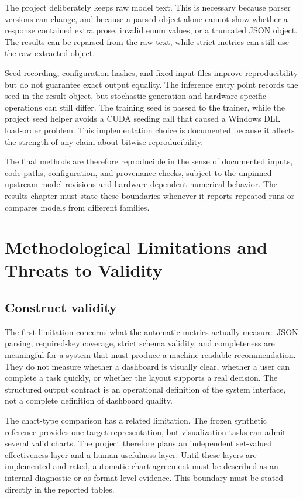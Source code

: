 The project deliberately keeps raw model text. This is necessary because parser versions can change, and because a parsed object alone cannot show whether a response contained extra prose, invalid enum values, or a truncated JSON object. The results can be reparsed from the raw text, while strict metrics can still use the raw extracted object.

Seed recording, configuration hashes, and fixed input files improve reproducibility but do not guarantee exact output equality. The inference entry point records the seed in the result object, but stochastic generation and hardware-specific operations can still differ. The training seed is passed to the trainer, while the project seed helper avoids a CUDA seeding call that caused a Windows DLL load-order problem. This implementation choice is documented because it affects the strength of any claim about bitwise reproducibility.

The final methods are therefore reproducible in the sense of documented inputs, code paths, configuration, and provenance checks, subject to the unpinned upstream model revisions and hardware-dependent numerical behavior. The results chapter must state these boundaries whenever it reports repeated runs or compares models from different families.

\section{Methodological Limitations and Threats to Validity}

\subsection{Construct validity}

The first limitation concerns what the automatic metrics actually measure. JSON parsing, required-key coverage, strict schema validity, and completeness are meaningful for a system that must produce a machine-readable recommendation. They do not measure whether a dashboard is visually clear, whether a user can complete a task quickly, or whether the layout supports a real decision. The structured output contract is an operational definition of the system interface, not a complete definition of dashboard quality.

The chart-type comparison has a related limitation. The frozen synthetic reference provides one target representation, but visualization tasks can admit several valid charts. The project therefore plans an independent set-valued effectiveness layer and a human usefulness layer. Until these layers are implemented and rated, automatic chart agreement must be described as an internal diagnostic or as format-level evidence. This boundary must be stated directly in the reported tables.

